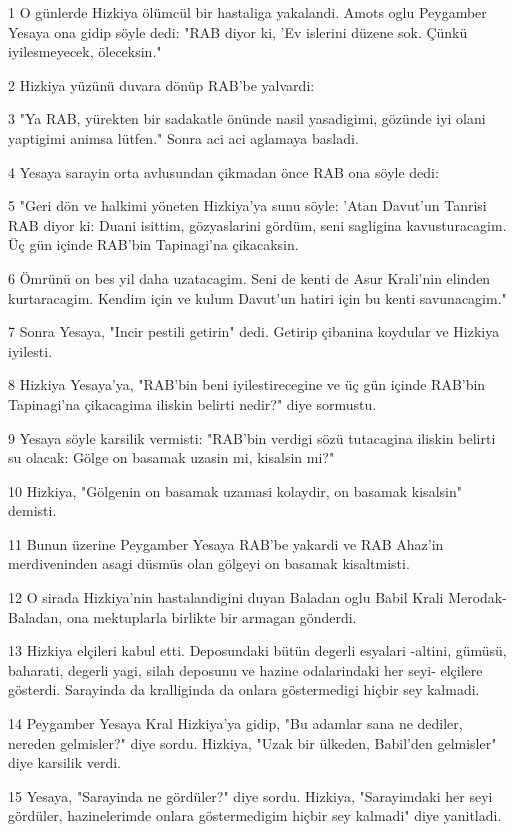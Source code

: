 \par 1 O günlerde Hizkiya ölümcül bir hastaliga yakalandi. Amots oglu Peygamber Yesaya ona gidip söyle dedi: "RAB diyor ki, 'Ev islerini düzene sok. Çünkü iyilesmeyecek, öleceksin."
\par 2 Hizkiya yüzünü duvara dönüp RAB'be yalvardi:
\par 3 "Ya RAB, yürekten bir sadakatle önünde nasil yasadigimi, gözünde iyi olani yaptigimi animsa lütfen." Sonra aci aci aglamaya basladi.
\par 4 Yesaya sarayin orta avlusundan çikmadan önce RAB ona söyle dedi:
\par 5 "Geri dön ve halkimi yöneten Hizkiya'ya sunu söyle: 'Atan Davut'un Tanrisi RAB diyor ki: Duani isittim, gözyaslarini gördüm, seni sagligina kavusturacagim. Üç gün içinde RAB'bin Tapinagi'na çikacaksin.
\par 6 Ömrünü on bes yil daha uzatacagim. Seni de kenti de Asur Krali'nin elinden kurtaracagim. Kendim için ve kulum Davut'un hatiri için bu kenti savunacagim."
\par 7 Sonra Yesaya, "Incir pestili getirin" dedi. Getirip çibanina koydular ve Hizkiya iyilesti.
\par 8 Hizkiya Yesaya'ya, "RAB'bin beni iyilestirecegine ve üç gün içinde RAB'bin Tapinagi'na çikacagima iliskin belirti nedir?" diye sormustu.
\par 9 Yesaya söyle karsilik vermisti: "RAB'bin verdigi sözü tutacagina iliskin belirti su olacak: Gölge on basamak uzasin mi, kisalsin mi?"
\par 10 Hizkiya, "Gölgenin on basamak uzamasi kolaydir, on basamak kisalsin" demisti.
\par 11 Bunun üzerine Peygamber Yesaya RAB'be yakardi ve RAB Ahaz'in merdiveninden asagi düsmüs olan gölgeyi on basamak kisaltmisti.
\par 12 O sirada Hizkiya'nin hastalandigini duyan Baladan oglu Babil Krali Merodak-Baladan, ona mektuplarla birlikte bir armagan gönderdi.
\par 13 Hizkiya elçileri kabul etti. Deposundaki bütün degerli esyalari -altini, gümüsü, baharati, degerli yagi, silah deposunu ve hazine odalarindaki her seyi- elçilere gösterdi. Sarayinda da kralliginda da onlara göstermedigi hiçbir sey kalmadi.
\par 14 Peygamber Yesaya Kral Hizkiya'ya gidip, "Bu adamlar sana ne dediler, nereden gelmisler?" diye sordu. Hizkiya, "Uzak bir ülkeden, Babil'den gelmisler" diye karsilik verdi.
\par 15 Yesaya, "Sarayinda ne gördüler?" diye sordu. Hizkiya, "Sarayimdaki her seyi gördüler, hazinelerimde onlara göstermedigim hiçbir sey kalmadi" diye yanitladi.
